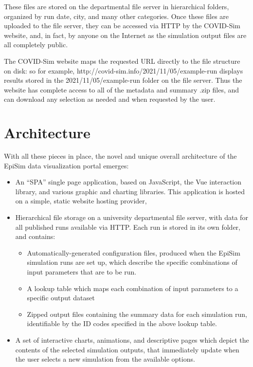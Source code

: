 These files are stored on the departmental file server in hierarchical folders, organized by run date, city, and many other categories. Once these files are uploaded to the file server, they can be accessed via HTTP by the COVID-Sim website, and, in fact, by anyone on the Internet as the simulation output files are all completely public.

The COVID-Sim website maps the requested URL directly to the file structure on disk: so for example, http://covid-sim.info/2021/11/05/example-run displays results stored in the 2021/11/05/example-run folder on the file server. Thus the website has complete access to all of the metadata and summary .zip files, and can download any selection as needed and when requested by the user.

\hypertarget{covid-architecture}{%
\section{Architecture}\label{architecture}}

With all these pieces in place, the novel and unique overall architecture of the EpiSim data visualization portal emerges:

\begin{itemize}
\item
  An ``SPA'' single page application, based on JavaScript, the Vue interaction library, and various graphic and charting libraries. This application is hosted on a simple, static website hosting provider,
\item
  Hierarchical file storage on a university departmental file server,
  with data for all published runs available via HTTP. Each run is
  stored in its own folder, and contains:

  \begin{itemize}
  \item
    Automatically-generated configuration files, produced when the
    EpiSim simulation runs are set up, which describe the specific
    combinations of input parameters that are to be run.
  \item
    A lookup table which maps each combination of input parameters to a
    specific output dataset
  \item
    Zipped output files containing the summary data for each simulation
    run, identifiable by the ID codes specified in the above lookup table.
  \end{itemize}
\item
  A set of interactive charts, animations, and descriptive pages which depict the
  contents of the selected simulation outputs, that immediately update when the user
  selects a new simulation from the available options.
\end{itemize}


